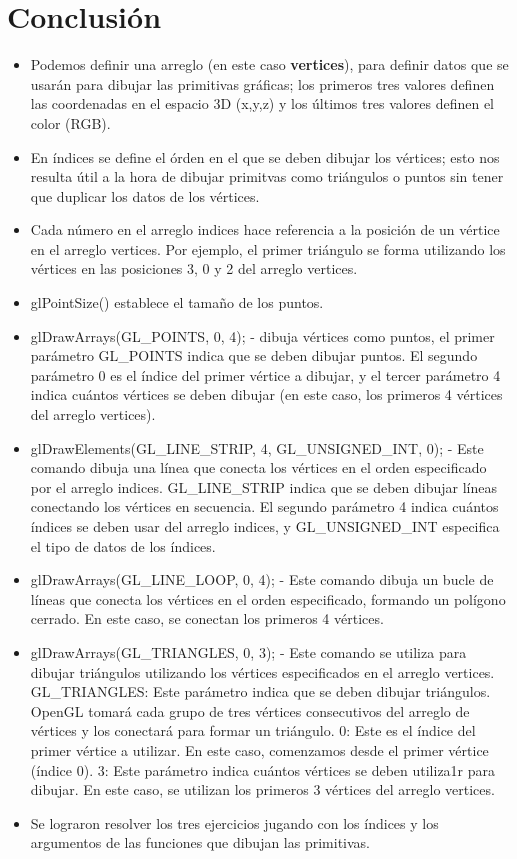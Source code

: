\documentclass[a4paper,11pt]{article}                 %
\begin{document}
\section{Conclusión}
\begin{itemize}
    \item Podemos definir una arreglo (en este caso \textbf{vertices}), para definir datos que se usarán para dibujar las primitivas gráficas; los primeros tres valores definen las coordenadas en el espacio 3D (x,y,z) y los últimos tres valores definen el color (RGB).
    \item En índices se define el órden en el que se deben dibujar los vértices; esto nos resulta útil a la hora de dibujar primitvas como triángulos o puntos sin tener que duplicar los datos de los vértices. 
    \item Cada número en el arreglo indices hace referencia a la posición de un vértice en el arreglo vertices. Por ejemplo, el primer triángulo se forma utilizando los vértices en las posiciones 3, 0 y 2 del arreglo vertices.
    \item glPointSize() establece el tamaño de los puntos.
    \item glDrawArrays(GL\_POINTS, 0, 4); - dibuja vértices como puntos, el primer parámetro GL\_POINTS indica que se deben dibujar puntos. El segundo parámetro 0 es el índice del primer vértice a dibujar, y el tercer parámetro 4 indica cuántos vértices se deben dibujar (en este caso, los primeros 4 vértices del arreglo vertices). 
    \item glDrawElements(GL\_LINE\_STRIP, 4, GL\_UNSIGNED\_INT, 0); - Este comando dibuja una línea que conecta los vértices en el orden especificado por el arreglo indices. GL\_LINE\_STRIP indica que se deben dibujar líneas conectando los vértices en secuencia. El segundo parámetro 4 indica cuántos índices se deben usar del arreglo indices, y GL\_UNSIGNED\_INT especifica el tipo de datos de los índices.
    \item glDrawArrays(GL\_LINE\_LOOP, 0, 4); - Este comando dibuja un bucle de líneas que conecta los vértices en el orden especificado, formando un polígono cerrado. En este caso, se conectan los primeros 4 vértices.
    \item glDrawArrays(GL\_TRIANGLES, 0, 3); - Este comando se utiliza para dibujar triángulos utilizando los vértices especificados en el arreglo vertices. GL\_TRIANGLES: Este parámetro indica que se deben dibujar triángulos. OpenGL tomará cada grupo de tres vértices consecutivos del arreglo de vértices y los conectará para formar un triángulo. 0: Este es el índice del primer vértice a utilizar. En este caso, comenzamos desde el primer vértice (índice 0). 3: Este parámetro indica cuántos vértices se deben utiliza1r para dibujar. En este caso, se utilizan los primeros 3 vértices del arreglo vertices.
    \item Se lograron resolver los tres ejercicios jugando con los índices y los argumentos de las funciones que dibujan las primitivas.
\end{itemize}
\end{document}
